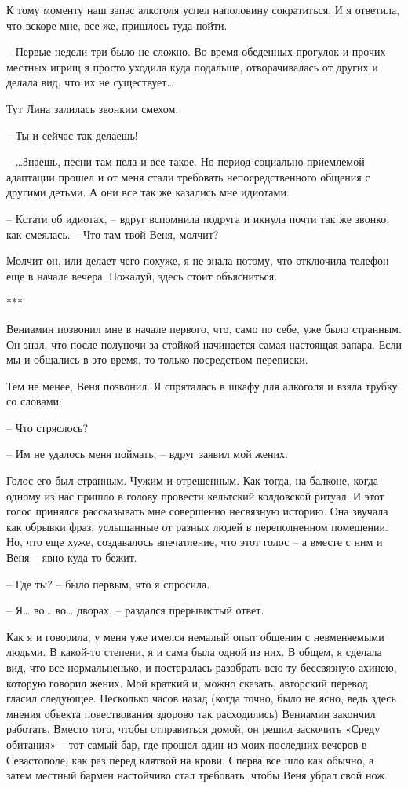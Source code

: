 \documentclass[
]{book}
\begin{document}
К тому моменту наш запас алкоголя успел наполовину сократиться. И я ответила, что вскоре мне, все же, пришлось туда пойти.

-- Первые недели три было не сложно. Во время обеденных прогулок и прочих местных игрищ я просто уходила куда подальше, отворачивалась от других и делала вид, что их не существует\ldots{}

Тут Лина залилась звонким смехом.

-- Ты и сейчас так делаешь!

-- \ldots Знаешь, песни там пела и все такое. Но период социально приемлемой адаптации прошел и от меня стали требовать непосредственного общения с другими детьми. А они все так же казались мне идиотами.

-- Кстати об идиотах, -- вдруг вспомнила подруга и икнула почти так же звонко, как смеялась. -- Что там твой Веня, молчит?

Молчит он, или делает чего похуже, я не знала потому, что отключила телефон еще в начале вечера. Пожалуй, здесь стоит объясниться.

***

Вениамин позвонил мне в начале первого, что, само по себе, уже было странным. Он знал, что после полуночи за стойкой начинается самая настоящая запара. Если мы и общались в это время, то только посредством переписки.

Тем не менее, Веня позвонил. Я спряталась в шкафу для алкоголя и взяла трубку со словами:

-- Что стряслось?

-- Им не удалось меня поймать, -- вдруг заявил мой жених.

Голос его был странным. Чужим и отрешенным. Как тогда, на балконе, когда одному из нас пришло в голову провести кельтский колдовской ритуал. И этот голос принялся рассказывать мне совершенно несвязную историю. Она звучала как обрывки фраз, услышанные от разных людей в переполненном помещении. Но, что еще хуже, создавалось впечатление, что этот голос -- а вместе с ним и Веня -- явно куда-то бежит.

-- Где ты? -- было первым, что я спросила.

-- Я\ldots{} во\ldots{} во\ldots{} дворах, -- раздался прерывистый ответ.

Как я и говорила, у меня уже имелся немалый опыт общения с невменяемыми людьми. В какой-то степени, я и сама была одной из них. В общем, я сделала вид, что все нормальненько, и постаралась разобрать всю ту бессвязную ахинею, которую говорил жених. Мой краткий и, можно сказать, авторский перевод гласил следующее. Несколько часов назад (когда точно, было не ясно, ведь здесь мнения объекта повествования здорово так расходились) Вениамин закончил работать. Вместо того, чтобы отправиться домой, он решил заскочить «Среду обитания» -- тот самый бар, где прошел один из моих последних вечеров в Севастополе, как раз перед клятвой на крови. Сперва все шло как обычно, а затем местный бармен настойчиво стал требовать, чтобы Веня убрал свой нож.
\end{document}
